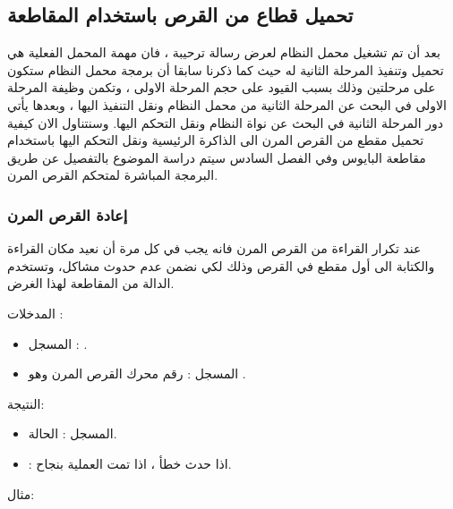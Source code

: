 \documentclass[document.tex]{subfiles}
\begin{document}
\subsection{تحميل قطاع من القرص باستخدام المقاطعة }

بعد أن تم تشغيل محمل النظام لعرض رسالة ترحيبة ، فان مهمة المحمل الفعلية هي تحميل وتنفيذ المرحلة الثانية له حيث كما ذكرنا سابقا أن برمجة محمل النظام ستكون على مرحلتين وذلك بسبب القيود على حجم المرحلة الاولى ، وتكمن وظيفة المرحلة الاولى في البحث عن المرحلة الثانية من محمل النظام ونقل التنفيذ اليها ، وبعدها يأتي دور المرحلة الثانية في البحث عن نواة النظام ونقل التحكم اليها. وسنتناول الان كيفية تحميل مقطع من القرص المرن الى الذاكرة الرئيسية ونقل التحكم اليها باستخدام مقاطعة البايوس  وفي الفصل السادس سيتم دراسة الموضوع بالتفصيل عن طريق البرمجة المباشرة  لمتحكم  القرص المرن.

\subsubsection{إعادة القرص المرن}
عند تكرار القراءة من القرص المرن فانه يجب في كل مرة أن نعيد مكان القراءة والكتابة الى أول مقطع  في القرص وذلك لكي نضمن عدم حدوث مشاكل، وتستخدم الدالة  من المقاطعة  لهذا الغرض.

المدخلات :
\begin{itemize}
\item المسجل   : .
\item المسجل  : رقم محرك القرص المرن وهو .
\end{itemize}
النتيجة:
\begin{itemize}
\item المسجل  : الحالة.
\item {} :  اذا حدث خطأ ،  اذا تمت العملية بنجاح.

\end{itemize}

مثال:
\begin{english}
\lstset{numberstyle=\tiny,numbers=left,stepnumber=1,numbersep=5pt,tabsize=2,extendedchars=true,breaklines=true,frame=b,showspaces=false, showtabs=false,xleftmargin=10pt,framexleftmargin=10pt,framexrightmargin=5pt,framexbottommargin=4pt,showstringspaces=false,language=[x86masm]Assembler}


\end{english}
\end{document}
